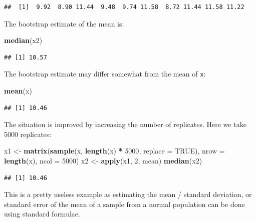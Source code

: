 \documentclass[12pt,a4paper]{book}
\newenvironment{Shaded}{\begin{snugshade}}{\end{snugshade}}
\newcommand{\DataTypeTok}[1]{\textcolor[rgb]{0.13,0.29,0.53}{#1}}
\newcommand{\DecValTok}[1]{\textcolor[rgb]{0.00,0.00,0.81}{#1}}
\newcommand{\KeywordTok}[1]{\textcolor[rgb]{0.13,0.29,0.53}{\textbf{#1}}}
\newcommand{\NormalTok}[1]{#1}
\newcommand{\OperatorTok}[1]{\textcolor[rgb]{0.81,0.36,0.00}{\textbf{#1}}}
\newcommand{\OtherTok}[1]{\textcolor[rgb]{0.56,0.35,0.01}{#1}}
\newcommand{\StringTok}[1]{\textcolor[rgb]{0.31,0.60,0.02}{#1}}
\theoremstyle{definition}
\theoremstyle{definition}
\theoremstyle{definition}
\theoremstyle{remark}
\begin{document}
\begin{verbatim}
##  [1]  9.92  8.90 11.44  9.48  9.74 11.58  8.72 11.44 11.58 11.22
\end{verbatim}

The bootstrap estimate of the mean is:

\begin{Shaded}
\begin{Highlighting}[]
\KeywordTok{median}\NormalTok{(x2)}
\end{Highlighting}
\end{Shaded}

\begin{verbatim}
## [1] 10.57
\end{verbatim}

The bootstrap estimate may differ somewhat from the mean of \texttt{x}:

\begin{Shaded}
\begin{Highlighting}[]
\KeywordTok{mean}\NormalTok{(x)}
\end{Highlighting}
\end{Shaded}

\begin{verbatim}
## [1] 10.46
\end{verbatim}

The situation is improved by increasing the number of replicates. Here
we take 5000 replicates:

\begin{Shaded}
\begin{Highlighting}[]
\NormalTok{x1 <-}\StringTok{ }\KeywordTok{matrix}\NormalTok{(}\KeywordTok{sample}\NormalTok{(x, }\KeywordTok{length}\NormalTok{(x) }\OperatorTok{*}\StringTok{ }\DecValTok{5000}\NormalTok{, }\DataTypeTok{replace =} \OtherTok{TRUE}\NormalTok{),}
             \DataTypeTok{nrow =} \KeywordTok{length}\NormalTok{(x), }\DataTypeTok{ncol =} \DecValTok{5000}\NormalTok{)}
\NormalTok{x2 <-}\StringTok{ }\KeywordTok{apply}\NormalTok{(x1, }\DecValTok{2}\NormalTok{, mean)}
\KeywordTok{median}\NormalTok{(x2)}
\end{Highlighting}
\end{Shaded}

\begin{verbatim}
## [1] 10.46
\end{verbatim}

This is a pretty useless example as estimating the mean / standard
deviation, or standard error of the mean of a sample from a normal
population can be done using standard formulae.
\end{document}
